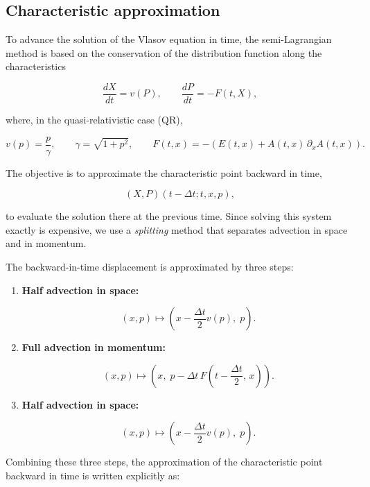 \documentclass[11pt,a4paper,twoside,pdf]{article}
\numberwithin{equation}{section}
\begin{document}



\subsection{Characteristic approximation}

To advance the solution of the Vlasov equation in time, the semi-Lagrangian method is based on the conservation of the distribution function along the characteristics


\[
\frac{dX}{dt} = v(P), \qquad \frac{dP}{dt} = -F(t,X),
\]


where, in the quasi-relativistic case (QR),


\[
v(p) = \frac{p}{\gamma}, \qquad \gamma = \sqrt{1+p^2}, \qquad
F(t,x) = -(E(t,x) + A(t,x)\,\partial_x A(t,x)).
\]



The objective is to approximate the characteristic point backward in time,


\[
(X,P)(t-\Delta t;t,x,p),
\]


to evaluate the solution there at the previous time. Since solving this system exactly is expensive, we use a \emph{splitting} method that separates advection in space and in momentum.


The backward-in-time displacement is approximated by three steps:

\begin{enumerate}
\item \textbf{Half advection in space:}


\[
(x,p) \longmapsto \left(x - \frac{\Delta t}{2}v(p),\; p\right).
\]



\item \textbf{Full advection in momentum:}


\[
(x,p) \longmapsto \left(x,\; p - \Delta t\,F\!\left(t - \frac{\Delta t}{2},\, x\right)\right).
\]



\item \textbf{Half advection in space:}


\[
(x,p) \longmapsto \left(x - \frac{\Delta t}{2}v(p),\; p\right).
\]


\end{enumerate}

Combining these three steps, the approximation of the characteristic point backward in time is written explicitly as:
\end{document}
